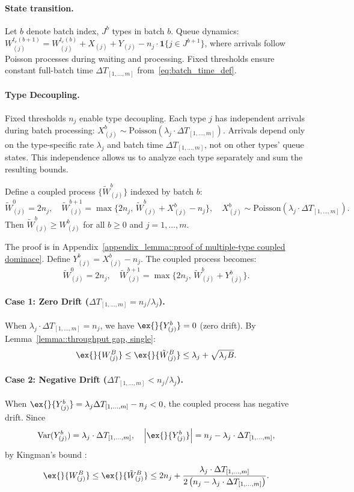 \paragraph{State transition.} Let $b$ denote batch index, $J^b$ types in batch $b$. Queue dynamics: $W_{(j)}^{t_e(b+1)}=W_{(j)}^{t_e(b)}+X_{(j)}+Y_{(j)}- n_j\cdot \mathbf{1}\{j\in J^{b+1}\}$, where arrivals follow Poisson processes during waiting and processing. Fixed thresholds ensure constant full-batch time $\Delta T_{[1,\ldots,m]}$ from~\eqref{eq:batch_time_def}.

\paragraph{Type Decoupling.}
Fixed thresholds $n_j$ enable type decoupling. Each type $j$ has independent arrivals during batch processing: $X^b_{(j)} \sim \text{Poisson}(\lambda_j \cdot \Delta T_{[1,\ldots,m]})$. Arrivals depend only on the type-specific rate $\lambda_j$ and batch time $\Delta T_{[1,\ldots,m]}$, not on other types' queue states. This independence allows us to analyze each type separately and sum the resulting bounds.

\begin{lemma}\label{lemma::multiple-type coupled dominace}
Define a coupled process $\{\tilde{W}^b_{(j)}\}$ indexed by batch $b$:
$$\tilde{W}_{(j)}^0=2n_j, \quad \tilde{W}_{(j)}^{b+1}= \max\{ 2n_j,\, \tilde{W}_{(j)}^b +X_{(j)}^b-n_j \},\quad X^b_{(j)} \sim \text{Poisson}(\lambda_j\cdot \Delta T_{[1,\ldots,m]}).$$
Then $\tilde{W}^b_{(j)}\geq W^b_{(j)}$ for all $b\geq 0$ and $j=1,\ldots,m$.
\end{lemma}
\noindent The proof is in Appendix~\ref{appendix_lemma::proof of multiple-type coupled dominace}. Define $Y^b_{(j)} = X^b_{(j)} - n_j$. The coupled process becomes:
$$\tilde{W}^0_{(j)} = 2n_j,\quad \tilde{W}^{b+1}_{(j)} = \max\{ 2n_j, \, \tilde{W}^b_{(j)}+Y^b_{(j)} \}.$$

\paragraph{Case 1: Zero Drift ($\Delta T_{[1,\ldots,m]} = n_j/\lambda_j$).} When $\lambda_j\cdot \Delta T_{[1,\ldots,m]} = n_j$, we have $\ex{}{Y^b_{(j)}}=0$ (zero drift). By Lemma~\ref{lemma::throughput gap, single}:
$$\ex{}{W^B_{(j)}}\leq \ex{}{\tilde{W}^B_{(j)}}\leq \lambda_j + \sqrt{\lambda_j B}.$$

\paragraph{Case 2: Negative Drift ($\Delta T_{[1,\ldots,m]} < n_j/\lambda_j$).} When $\ex{}{Y^b_{(j)}}= \lambda_j \Delta T_{[1,\ldots,m]} - n_j <0$, the coupled process has negative drift. Since
$$\text{Var}(Y^b_{(j)}) = \lambda_j \cdot \Delta T_{[1,\ldots,m]},\quad
\left| \ex{}{Y^b_{(j)}} \right| = n_j - \lambda_j\cdot \Delta T_{[1,\ldots,m]},$$
by Kingman's bound \citep{kingman1962queues}:
$$\ex{}{W^B_{(j)}}\leq \ex{}{\tilde{W}^B_{(j)}}\leq 2n_j+ \frac{\lambda_j \cdot \Delta T_{[1,\ldots,m]}}{2\left(n_j - \lambda_j\cdot \Delta T_{[1,\ldots,m]}\right)}.$$

